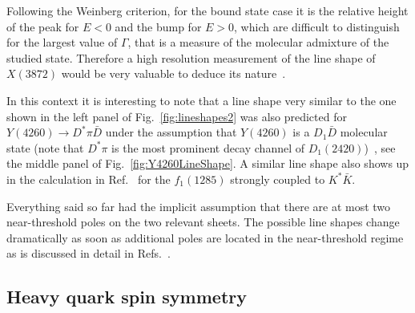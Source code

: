  Following the Weinberg criterion, for the bound state case it is the relative
 height of the peak for $E<0$ and the bump for $E>0$, which are difficult to
 distinguish for the largest value of $\Gamma$, that is a measure of the
 molecular admixture of the studied state. Therefore a high resolution
 measurement of the line shape of $X(3872)$ would be very valuable to deduce its
 nature~\cite{Hanhart:2007yq,Braaten:2007dw,Hanhart:2010wh,Meng:2014ota,
 Kang:2016jxw}.

 In this context it is interesting to note that a line shape very similar to the
one shown in the left panel of Fig.~\ref{fig:lineshapes2}
 was also predicted for $Y(4260)\to D^*\pi \bar D$ under the assumption that
 $Y(4260)$ is a $D_1\bar D$ molecular state (note that $D^*\pi$ is the most
 prominent decay channel of $D_1(2420)$)~\cite{Wang:2013kra}, see the middle 
panel of Fig.~\ref{fig:Y4260LineShape}. A similar line shape also shows up in
the calculation in Ref.~\cite{Debastiani:2016xgg} for the $f_1(1285)$
strongly coupled to $K^*\bar K$.


Everything said so far had the implicit assumption that there are at most two
near-threshold poles on the two relevant sheets. The possible line shapes change
dramatically as soon as additional poles are located in the near-threshold
regime as is discussed in detail in
Refs.~\cite{Baru:2010ww,Artoisenet:2010va,Hanhart:2011jz}.

\subsection{Heavy quark spin symmetry}
\label{sec:3_HQSS}

